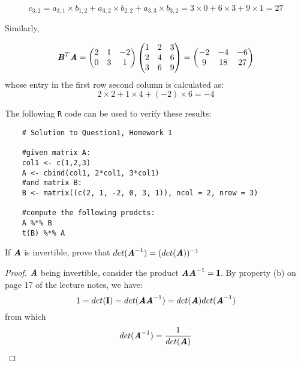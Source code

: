 \documentclass[12pt]{article}
\newcommand{\blditA}{\textbf{\textit{A}}}
\newcommand{\blditB}{\textbf{\textit{B}}}
\newcommand{\bldI}{\textbf{I}}
\newenvironment{question}[2][Question]{\begin{trivlist}
\item[\hskip \labelsep {\bfseries #1}\hskip \labelsep {\bfseries #2.}]}{\end{trivlist}}
\begin{document}
 \begin{equation*}
 c_{3,2} = a_{3,1}\times b_{1,2} +  a_{3,2}\times b_{2,2}  +  a_{3,3}\times b_{3,2} = 3\times 0 + 6\times 3 + 9\times 1 = 27
 \end{equation*}
 
 Similarly,

\begin{equation*} 
\blditB^T \blditA= 
 \begin{pmatrix}
  2 & 1 & -2\\
  0 & 3 & 1\\
\end{pmatrix}
 \begin{pmatrix}
  1 & 2 & 3\\
  2 & 4 & 6\\
  3 & 6 & 9
\end{pmatrix} = 
 \begin{pmatrix}
   -2 & -4 & -6\\
    9  & 18 & 27
\end{pmatrix}
 \end{equation*}
 whose entry in the first row second column is calculated as:
  \begin{equation*}
 2\times 2 + 1\times 4 + (-2)\times 6 = -4
 \end{equation*}
 
 The following {\tt R} code can be used to verify these results:
 
 \begin{verbatim}
	# Solution to Question1, Homework 1

	#given matrix A:
	col1 <- c(1,2,3)
	A <- cbind(col1, 2*col1, 3*col1)
	#and matrix B:
	B <- matrix((c(2, 1, -2, 0, 3, 1)), ncol = 2, nrow = 3)

	#compute the following prodcts:
	A %*% B
	t(B) %*% A
\end{verbatim}

\bigskip
\bigskip

\begin{question}{1.2} 
If $\blditA$ is invertible, prove that $det(\blditA^{-1} ) = (det(\blditA))^{-1}$
\end{question}
\begin{proof}
$\textbf{\textit{A}} $ being invertible, consider the product $\blditA \blditA^{-1} = \bldI$. By property (b) on page 17 of the lecture notes, we have:
\begin{equation*} 
1 = det(\bldI) = 
det(\blditA \blditA^{-1}) = det(\blditA) det(\blditA^{-1})
\end{equation*}
from which
\begin{equation*}
det(\blditA^{-1}) = \frac{1}{det(\blditA)}
\end{equation*}
\end{proof}
\end{document}
